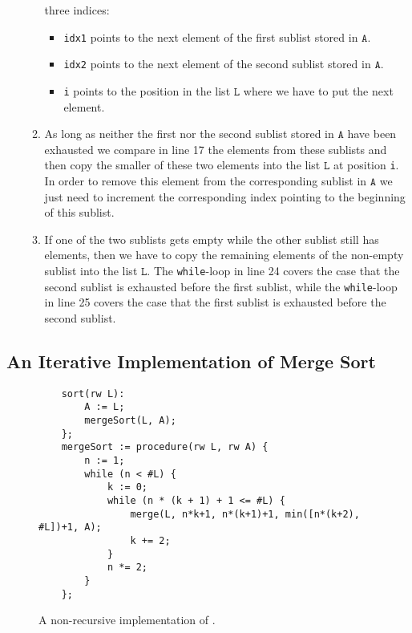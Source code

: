 \begin{enumerate}
\begin{enumerate}
            three indices: 
            \begin{itemize}
            \item \texttt{idx1} points to the next element of the first sublist stored in $\texttt{A}$.
            \item \texttt{idx2} points to the next element of the second sublist stored in $\texttt{A}$.
            \item \texttt{i} points to the position in the list $\texttt{L}$ where we have to put the next
                       element.
            \end{itemize}
      \item As long as neither the first nor the second sublist stored in $\texttt{A}$ have been exhausted
            we compare in line 17 the elements from these sublists and then copy the smaller of these
            two elements into the list $\texttt{L}$ at position \texttt{i}.
            In order to remove this element from the corresponding sublist in $\texttt{A}$ we just need to
            increment the corresponding index pointing to the beginning of this sublist.
      \item If one of the two sublists gets empty while the other sublist still has elements, then we have
            to copy the remaining elements of the non-empty sublist into the list $\texttt{L}$.
            The \texttt{while}-loop in line 24 covers the case that the second sublist is exhausted before 
            the first sublist, while the \texttt{while}-loop in line 25 covers the case that the first
            sublist is exhausted before the second sublist.
      \end{enumerate}
\end{enumerate}

\subsection{An Iterative Implementation of Merge Sort}

\begin{figure}[!ht]
  \centering
\begin{verbatim}
    sort(rw L):
        A := L;
        mergeSort(L, A);
    };
    mergeSort := procedure(rw L, rw A) {
        n := 1;
        while (n < #L) {
            k := 0;
            while (n * (k + 1) + 1 <= #L) {
                merge(L, n*k+1, n*(k+1)+1, min([n*(k+2), #L])+1, A);
                k += 2;    
            }
            n *= 2;
        }
    };
\end{verbatim}
\vspace*{-0.3cm}
  \caption{A non-recursive implementation of .}
  \label{fig:merge-sort-nr.stlx}
\end{figure}


